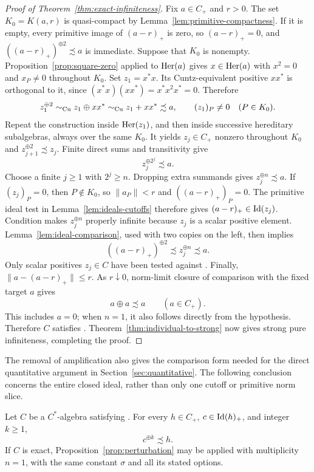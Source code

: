 \begin{proof}[Proof of Theorem~\ref{thm:exact-infiniteness}]
Fix $a\in C_+$ and $r>0$.  The set $K_0=K(a,r)$ is quasi-compact by
Lemma~\ref{lem:primitive-compactness}.  If it is empty, every primitive
image of $(a-r)_+$ is zero, so $(a-r)_+=0$, and
$((a-r)_+)^{\oplus2}\precsim a$ is immediate.
Suppose that $K_0$ is nonempty.  Proposition~\ref{prop:square-zero}
applied to $\operatorname{Her}(a)$ gives $x\in\operatorname{Her}(a)$ with $x^2=0$ and
$x_P\ne0$ throughout $K_0$.  Set $z_1=x^*x$.  Its Cuntz-equivalent
positive $xx^*$ is orthogonal to it, since
$(x^*x)(xx^*)=x^*x^2x^*=0$.  Therefore
\[
 z_1^{\oplus2}\sim_{\mathrm{Cu}} z_1\oplus xx^*
 \sim_{\mathrm{Cu}} z_1+xx^*\precsim a,
 \qquad (z_1)_P\ne0\quad(P\in K_0).
\]
Repeat the construction inside $\operatorname{Her}(z_1)$, and then inside successive
hereditary subalgebras, always over the same $K_0$.  It yields
$z_j\in C_+$ nonzero throughout $K_0$ and
$z_{j+1}^{\oplus2}\precsim z_j$.  Finite direct sums and transitivity
give
\[
 z_j^{\oplus 2^j}\precsim a.
\]
Choose a finite $j\ge1$ with $2^j\ge n$.  Dropping extra summands gives
$z_j^{\oplus n}\precsim a$.  If $(z_j)_P=0$, then $P\notin K_0$, so
$\|a_P\|<r$ and $((a-r)_+)_P=0$.  The primitive ideal test in
Lemma~\ref{lem:ideals-cutoffs} therefore gives
$(a-r)_+\in\operatorname{Id}(z_j)$.  Condition \propF{} makes $z_j^{\oplus n}$ properly infinite because
$z_j$ is a scalar positive element.
Lemma~\ref{lem:ideal-comparison}, used with two copies on the left,
then implies
\[
 ((a-r)_+)^{\oplus2}\precsim z_j^{\oplus n}\precsim a.
\]
Only scalar positives $z_j\in C$ have been tested against \propF{}.
Finally, $\|a-(a-r)_+\|\le r$.  As $r\downarrow0$, norm-limit closure
of comparison with the fixed target $a$ gives
\begin{equation}\label{eq:individual-infiniteness}
 a\oplus a\precsim a\qquad(a\in C_+).
\end{equation}
This includes $a=0$; when $n=1$, it also follows directly from the
hypothesis.  Therefore $C$ satisfies \propP{}.
Theorem~\ref{thm:individual-to-strong} now gives strong pure
infiniteness, completing the proof.
\end{proof}

The removal of amplification also gives the comparison form needed
for the direct quantitative argument in Section~\ref{sec:quantitative}.
The following conclusion concerns the entire closed ideal, rather
than only one cutoff or primitive norm slice.

\begin{corollary}\label{cor:ideal-comparison}
Let $C$ be a $C^*$-algebra satisfying \propP{}.  For every $h\in C_+$,
$c\in\operatorname{Id}(h)_+$, and integer $k\ge1$,
\[
 c^{\oplus k}\precsim h.
\]
If $C$ is exact, Proposition~\ref{prop:perturbation} may be applied
with multiplicity $n=1$, with the same constant $\sigma$ and all its
stated options.
\end{corollary}

